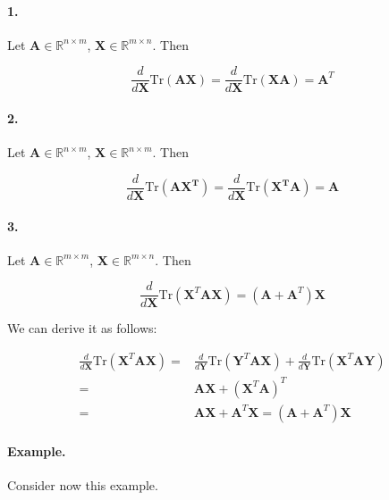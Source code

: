 \documentclass{article}
\begin{document}
\begin{appendices}
\paragraph{1.} Let $\mathbf{A} \in \mathbb{R}^{n\times m}$, $\mathbf{X} \in \mathbb{R}^{m\times n}$. Then

\begin{equation}
    \frac{d}{d\mathbf{X}}\text{Tr}(\mathbf{AX}) = \frac{d}{d\mathbf{X}}\text{Tr}(\mathbf{XA}) = \mathbf{A}^T
\end{equation}

\paragraph{2.} Let $\mathbf{A} \in \mathbb{R}^{n\times m}$, $\mathbf{X} \in \mathbb{R}^{n\times m}$. Then

\begin{equation}
    \frac{d}{d\mathbf{X}}\text{Tr}(\mathbf{AX^T}) = \frac{d}{d\mathbf{X}}\text{Tr}(\mathbf{X^TA}) = \mathbf{A}
\end{equation}


\paragraph{3.} Let $\mathbf{A} \in \mathbb{R}^{m\times m}$, $\mathbf{X} \in \mathbb{R}^{m\times n}$. Then

\begin{equation}
    \frac{d}{d\mathbf{X}} \text{Tr}(\mathbf{X}^T \mathbf{A} \mathbf{X}) = (\mathbf{A} + \mathbf{A}^T) \mathbf{X}
\end{equation}

We can derive it as follows:

\[
\begin{split}
    \frac{d}{d\mathbf{X}} \text{Tr}(\mathbf{X}^T \mathbf{A} \mathbf{X}) =& \frac{d}{d\mathbf{Y}} \text{Tr}(\mathbf{Y}^T \mathbf{A} \mathbf{X}) + \frac{d}{d\mathbf{Y}} \text{Tr}(\mathbf{X}^T \mathbf{A} \mathbf{Y})\\
    =& \mathbf{A} \mathbf{X} + (\mathbf{X}^T \mathbf{A})^T\\
    =& \mathbf{A} \mathbf{X} + \mathbf{A}^T \mathbf{X} = (\mathbf{A} + \mathbf{A}^T) \mathbf{X}
\end{split}
\]

\paragraph{Example.} Consider now this example.


\end{appendices}
\end{document}
